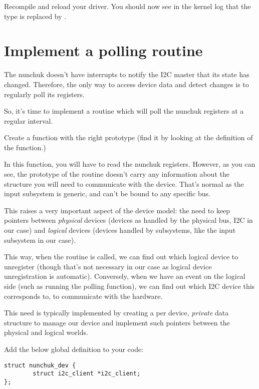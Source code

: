 Recompile and reload your driver. You should now see in the kernel log
that the  type is replaced by
.

\section{Implement a polling routine}

The nunchuk doesn't have interrupts to notify the I2C master that
its state has changed. Therefore, the only way to access device data
and detect changes is to regularly poll its registers.

So, it's time to implement a routine which will poll the nunchuk registers
at a regular interval.

Create a  function with the right prototype (find
it by looking at the definition of the  function.)

In this function, you will have to read the nunchuk registers. However,
as you can see, the prototype of the  routine doesn't
carry any information about the  structure you will
need to communicate with the device. That's normal as the input
subsystem is generic, and can't be bound to any specific bus.

This raises a very important aspect of the device model: the need to
keep pointers between {\em physical} devices (devices as handled by the
physical bus, I2C in our case) and {\em logical} devices (devices
handled by subsystems, like the input subsystem in our case).

This way, when the  routine is called, we can find out
which logical device to unregister (though that's not necessary in our
case as logical device unregistration is automatic). Conversely, when we
have an event on the logical side (such as running the polling
function), we can find out which I2C device this corresponds to,
to communicate with the hardware.

This need is typically implemented by creating a per device, {\em private} data
structure to manage our device and implement such pointers between
the physical and logical worlds.

Add the below global definition to your code:

\begin{verbatim}
struct nunchuk_dev {
        struct i2c_client *i2c_client;
};
\end{verbatim}

